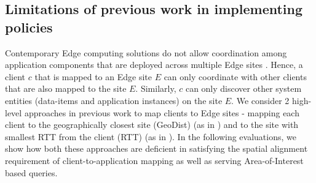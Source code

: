 \subsection{Limitations of previous work in implementing policies}
Contemporary Edge computing solutions do not allow coordination among application components that are deployed across multiple Edge sites \cite{gabriel, azure_iot_edge}. Hence, a client $c$ that is mapped to an Edge site $E$ can only coordinate with other clients that are also mapped to the site $E$. Similarly, $c$ can only discover other system entities (data-items and application instances) on the site $E$. We consider 2 high-level approaches in previous work to map clients to Edge sites - mapping each client to the geographically closest site (GeoDist) (as in \cite{lahderanta2021edge}) and to the site with smallest RTT from the client (RTT) (as in \cite{foglets}). In the following evaluations, we show how both these approaches are deficient in satisfying the spatial alignment requirement of client-to-application mapping as well as serving Area-of-Interest based queries.


